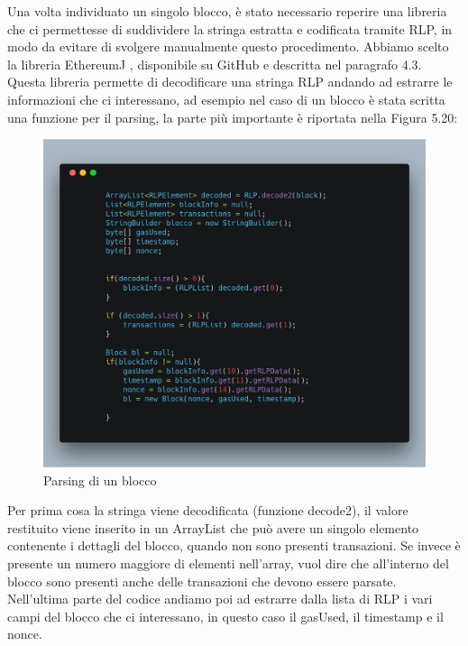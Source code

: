 \documentclass[12pt]{report}
\begin{document}
Una volta individuato un singolo blocco, è stato necessario reperire una libreria che ci permettesse di suddividere la stringa estratta e codificata tramite RLP, in modo da evitare di svolgere manualmente questo procedimento.
Abbiamo scelto la libreria EthereumJ \cite{EthereumJ}, disponibile su GitHub e descritta nel paragrafo 4.3.
Questa libreria permette di decodificare una stringa RLP andando ad estrarre le informazioni che ci interessano, ad esempio nel caso di un blocco è stata scritta una funzione per il parsing, la parte più importante è riportata nella Figura 5.20:

\begin{figure}[H]
    \includegraphics[width=\textwidth]{carbon-14}
    \caption{Parsing di un blocco}
\end{figure}


Per prima cosa la stringa viene decodificata (funzione decode2), il valore restituito viene inserito in un ArrayList che può avere un singolo elemento contenente i dettagli del blocco, quando non sono presenti transazioni. Se invece è presente un numero maggiore di elementi nell'array, vuol dire che all'interno del blocco sono presenti anche delle transazioni che devono essere parsate.
Nell'ultima parte del codice andiamo poi ad estrarre dalla lista di RLP i vari campi del blocco che ci interessano, in questo caso il gasUsed, il timestamp e il nonce.
\end{document}
